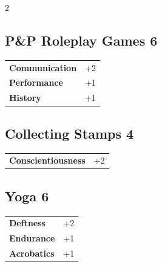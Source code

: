 \begin{multicols}{2}
\begin{tcolorbox}
\end{tcolorbox}

\begin{tcolorbox}
    \subsection*{P\&P Roleplay Games \hfill \small{6 }}
    \tcblower




\begin{tabular}{@{}ll@{}}
    \textbf{Communication} & +2\\
    \textbf{Performance} & +1\\
    \textbf{History} & +1\\
\end{tabular}


\end{tcolorbox}

\begin{tcolorbox}
    \subsection*{Collecting Stamps \hfill \small{4 }}
    \tcblower




\begin{tabular}{@{}ll@{}}
    \textbf{Conscientiousness} & +2\\
\end{tabular}


\end{tcolorbox}

\begin{tcolorbox}
    \subsection*{Yoga \hfill \small{6 }}
    \tcblower




\begin{tabular}{@{}ll@{}}
    \textbf{Deftness} & +2\\
    \textbf{Endurance} & +1\\
    \textbf{Acrobatics} & +1\\
\end{tabular}


\end{tcolorbox}
\end{multicols}
